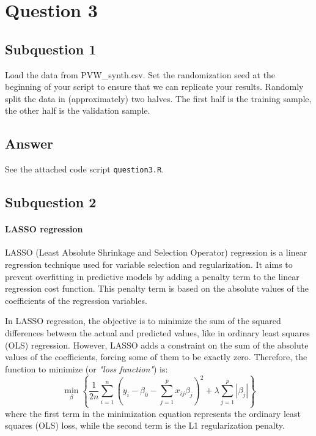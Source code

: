 \documentclass{article}
\begin{document}
	\section{Question 3}
	\subsection{Subquestion 1}
	Load the data from PVW\_synth.csv. Set the randomization seed at the beginning of your script to ensure that we can replicate your results. Randomly split the data in (approximately) two halves. The first half is the training sample, the other half is the validation sample.
	\subsection{Answer}
	See the attached code script \verb|question3.R|.
	
	\subsection{Subquestion 2}
	
	\paragraph{LASSO regression}
	LASSO (Least Absolute Shrinkage and Selection Operator) regression is a linear regression technique used for variable selection and regularization. It aims to prevent overfitting in predictive models by adding a penalty term to the linear regression cost function. This penalty term is based on the absolute values of the coefficients of the regression variables.
	
	In LASSO regression, the objective is to minimize the sum of the squared differences between the actual and predicted values, like in ordinary least squares (OLS) regression. However, LASSO adds a constraint on the sum of the absolute values of the coefficients, forcing some of them to be exactly zero. Therefore, the function to minimize (or \textit{"loss function"}) is:
	\begin{equation} \label{eq:lasso_loss}
		\min_{\beta} \left\{ \frac{1}{2n} \sum_{i=1}^{n} (y_i - \beta_0 - \sum_{j=1}^{p} x_{ij}\beta_j)^2 + \lambda \sum_{j=1}^{p} |\beta_j| \right\}
	\end{equation}
	where the first term in the minimization equation represents the ordinary least squares (OLS) loss, while the second term is the L1 regularization penalty.
	
\end{document}
